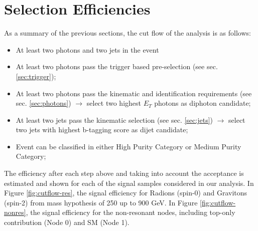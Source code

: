 \section{Selection Efficiencies}
\label{sec:selection}

As a summary of the previous sections, the cut flow of the analysis is as follows:
\begin{itemize}
\item At least two photons and two jets in the event
\item At least two photons pass the trigger based pre-selection (see sec. \ref{sec:trigger});
\item At least two photons pass the kinematic and identification requirements (see sec. \ref{sec:photons}) $\to$ select two highest $E_{T}$ photons as diphoton candidate;
\item At least two jets pass the kinematic selection (see sec. \ref{sec:jets}) $\to$ select two jets with highest b-tagging score as dijet candidate;
\item Event can be classified in either High Purity Category or Medium Purity Category;
\end{itemize}

The efficiency after each step above and taking into account the acceptance is estimated and shown for each of the signal samples considered in our analysis. 
In Figure \ref{fig:cutflow-res}, the signal efficiency for Radions (spin-0) and Gravitons (spin-2) from mass hypothesis of 250 up to 900 GeV. 
In Figure \ref{fig:cutflow-nonres}, the signal efficiency for the non-resonant nodes, including top-only contribution (Node 0) and SM (Node 1). 


